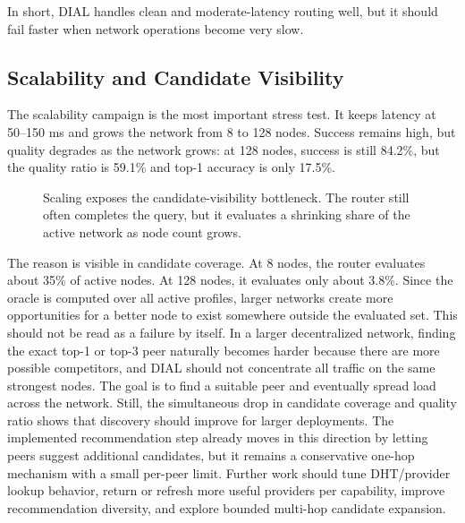 In short, DIAL handles clean and moderate-latency routing well, but it should
fail faster when network operations become very slow.

\subsection{Scalability and Candidate Visibility}

The scalability campaign is the most important stress test. It keeps latency at
50--150 ms and grows the network from 8 to 128 nodes. Success remains high, but
quality degrades as the network grows: at 128 nodes, success is still 84.2\%,
but the quality ratio is 59.1\% and top-1 accuracy is only 17.5\%.

\begin{figure}[H]
\centering
{}
\caption{Scaling exposes the candidate-visibility bottleneck. The router still often completes the query, but it evaluates a shrinking share of the active network as node count grows.}
\end{figure}

The reason is visible in candidate coverage. At 8 nodes, the router evaluates
about 35\% of active nodes. At 128 nodes, it evaluates only about 3.8\%. Since
the oracle is computed over all active profiles, larger networks create more
opportunities for a better node to exist somewhere outside the evaluated set.
This should not be read as a failure by itself. In a larger decentralized
network, finding the exact top-1 or top-3 peer naturally becomes harder because
there are more possible competitors, and DIAL should not concentrate all
traffic on the same strongest nodes. The goal is to find a suitable peer and
eventually spread load across the network. Still, the simultaneous drop in
candidate coverage and quality ratio shows that discovery should improve for
larger deployments. The implemented recommendation step already moves in this
direction by letting peers suggest additional candidates, but it remains a
conservative one-hop mechanism with a small per-peer limit. Further work should
tune DHT/provider lookup behavior, return or refresh more useful providers per
capability, improve recommendation diversity, and explore bounded multi-hop
candidate expansion.

